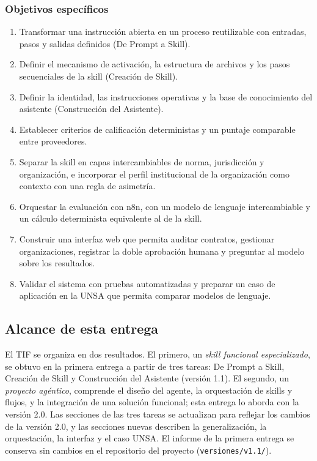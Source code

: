 \documentclass[12pt,letterpaper]{article}
\begin{document}
\subsubsection{Objetivos específicos}

\begin{enumerate}
  \item Transformar una instrucción abierta en un proceso reutilizable con entradas, pasos y salidas definidos (De Prompt a Skill).
  \item Definir el mecanismo de activación, la estructura de archivos y los pasos secuenciales de la skill (Creación de Skill).
  \item Definir la identidad, las instrucciones operativas y la base de conocimiento del asistente (Construcción del Asistente).
  \item Establecer criterios de calificación deterministas y un puntaje comparable entre proveedores.
  \item Separar la skill en capas intercambiables de norma, jurisdicción y organización, e incorporar el perfil institucional de la organización como contexto con una regla de asimetría.
  \item Orquestar la evaluación con n8n, con un modelo de lenguaje intercambiable y un cálculo determinista equivalente al de la skill.
  \item Construir una interfaz web que permita auditar contratos, gestionar organizaciones, registrar la doble aprobación humana y preguntar al modelo sobre los resultados.
  \item Validar el sistema con pruebas automatizadas y preparar un caso de aplicación en la UNSA que permita comparar modelos de lenguaje.
\end{enumerate}

\subsection{Alcance de esta entrega}

El TIF se organiza en dos resultados. El primero, un \emph{skill funcional especializado}, se obtuvo en la primera entrega a partir de tres tareas: De Prompt a Skill, Creación de Skill y Construcción del Asistente (versión 1.1). El segundo, un \emph{proyecto agéntico}, comprende el diseño del agente, la orquestación de skills y flujos, y la integración de una solución funcional; esta entrega lo aborda con la versión 2.0. Las secciones de las tres tareas se actualizan para reflejar los cambios de la versión 2.0, y las secciones nuevas describen la generalización, la orquestación, la interfaz y el caso UNSA. El informe de la primera entrega se conserva sin cambios en el repositorio del proyecto (\texttt{versiones/v1.1/}).
\end{document}
